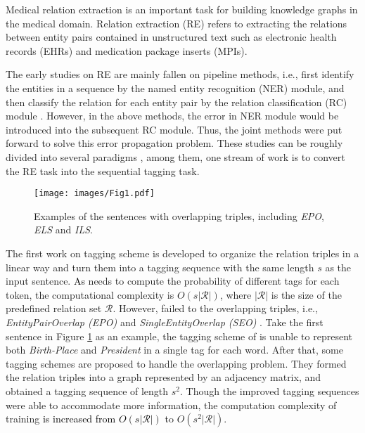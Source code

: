 \documentclass[conference]{IEEEtran}
\newcommand{\yankun}[1]{\textcolor{black}{#1}}
\begin{document}
Medical relation extraction is an important task for building knowledge graphs in the medical domain. Relation extraction (RE) refers to extracting the relations between entity pairs contained in unstructured text such as electronic health records (EHRs) and medication package inserts (MPIs).



The early studies on RE are mainly fallen on pipeline methods, i.e., first identify the entities in a sequence by the named entity recognition (NER) module, and then classify the relation for each entity pair by the relation classification (RC) module \cite{Socher2012Semantic,Zeng2014Relation}. However, in the above methods, the error in NER module would be introduced into the subsequent RC module. Thus, the joint methods were put forward to solve this error propagation problem. These studies
can be roughly divided into several paradigms \cite{Miwa2016End,Zheng2017Joint,Zeng2018Extracting}, among them, one stream of work is to convert the RE task into the sequential tagging task.
\begin{figure}[t]
    \centering
    \texttt{[image: images/Fig1.pdf]}
\caption{Examples of the sentences with overlapping triples, including \emph{EPO}, \emph{ELS} and \emph{ILS}.}
    \label{Fig:overlapping}
\end{figure}
The first work on tagging scheme \cite{Zheng2017Joint} is developed to organize the relation triples in a linear way and turn them into a tagging sequence with the same length $s$ as the input sentence. \yankun{As }\cite{Zheng2017Joint} needs to compute the probability of different tags for each token, 
the computational complexity is $O(s|\mathcal{R}|)$, where $|\mathcal{R}|$ is the size of the predefined relation set $\mathcal{R}$. However, 
\yankun{\cite{Zheng2017Joint}} failed to the overlapping triples, i.e., \emph{EntityPairOverlap (EPO)} and \emph{SingleEntityOverlap (SEO)} \cite{Zeng2018Extracting}. Take the first sentence in Figure \ref{Fig:overlapping} as an example, the tagging scheme of \cite{Zheng2017Joint} is unable to represent both \emph{Birth-Place} and \emph{President} in a single tag for each word. After that, some tagging schemes \cite{Dai2019Joint,Wang2020TPLinker} are proposed to handle the overlapping problem. They formed the relation triples into a graph represented by an adjacency matrix, and obtained a tagging sequence of length $s^2$. Though the improved tagging sequences were able to accommodate more information, the computation complexity of training 
\yankun{is increased from $O(s|\mathcal{R}|)$ }to $O(s^2|\mathcal{R}|)$.
\end{document}
